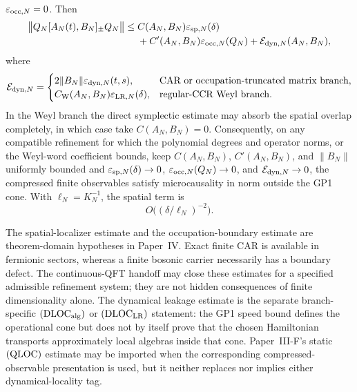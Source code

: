 \documentclass[12pt,a4paper]{article}
\begin{document}
\begin{theorem}
\(\varepsilon_{{\rm occ},N}=0\).  Then
\begin{equation}
\label{p4:eq:approx-microcausality-bound}
\begin{aligned}
\bigl\|Q_N[A_N(t),B_N]_{\pm}Q_N\bigr\|
\le{}&
C(A_N,B_N)\varepsilon_{{\rm sp},N}(\delta)\\
&+
C'(A_N,B_N)\varepsilon_{{\rm occ},N}(Q_N)
+\mathcal E_{{\rm dyn},N}(A_N,B_N),
\end{aligned}
\end{equation}
where
\[
\mathcal E_{{\rm dyn},N}=
\begin{cases}
2\|B_N\|\varepsilon_{{\rm dyn},N}(t,s),
&\text{CAR or occupation-truncated matrix branch},\\
C_{\rm W}(A_N,B_N)\varepsilon_{{\rm LR},N}(\delta),
&\text{regular-CCR Weyl branch}.
\end{cases}
\]
In the Weyl branch the direct symplectic estimate may absorb the spatial
overlap completely, in which case take \(C(A_N,B_N)=0\).
Consequently, on any compatible refinement for which the polynomial
degrees and operator norms, or the Weyl-word coefficient bounds, keep
\(C(A_N,B_N)\), \(C'(A_N,B_N)\), and \(\|B_N\|\) uniformly bounded and
\(\varepsilon_{{\rm sp},N}(\delta)\to0\),
\(\varepsilon_{{\rm occ},N}(Q_N)\to0\), and
\(\mathcal E_{{\rm dyn},N}\to0\), the compressed finite observables
satisfy microcausality in norm outside the GP1 cone.  With
\(\ell_N=K_N^{-1}\), the
spatial term is
\begin{equation}
\label{p4:eq:framework-microcausality-bound}
O\bigl((\delta/\ell_N)^{-2}\bigr).
\end{equation}
\end{theorem}

\begin{remark}
\label{p4:rem:microcausality-leakage-status}
The spatial-localizer estimate and the occupation-boundary estimate are
theorem-domain hypotheses in Paper~IV.  Exact finite CAR is available in
fermionic sectors, whereas a finite bosonic carrier necessarily has a
boundary defect.  The continuous-QFT handoff may close these estimates for
a specified admissible refinement system; they are not hidden consequences
of finite dimensionality alone.  The dynamical leakage estimate is the
separate branch-specific \((\mathrm{DLOC}_{\rm alg})\) or
\((\mathrm{DLOC}_{\rm LR})\) statement: the GP1 speed bound defines the
operational cone but does not by itself prove that the chosen Hamiltonian
transports approximately local algebras inside that cone.  Paper~III-F's
static \(({\rm QLOC})\) estimate may be imported when the corresponding
compressed-observable presentation is used, but it neither replaces nor
implies either dynamical-locality tag.
\end{remark}
\end{document}
